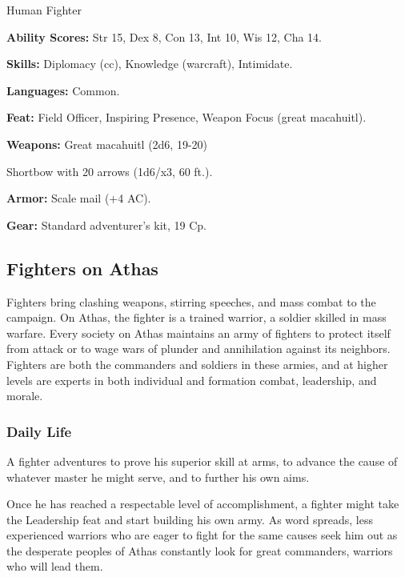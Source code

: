 Human Fighter

\textbf{Ability Scores:} Str 15, Dex 8, Con 13, Int 10, Wis 12, Cha 14.

\textbf{Skills:} Diplomacy (cc), Knowledge (warcraft), Intimidate.

\textbf{Languages:} Common.

\textbf{Feat:} Field Officer, Inspiring Presence, Weapon Focus (great macahuitl).

\textbf{Weapons:} Great macahuitl (2d6, 19-20)

Shortbow with 20 arrows (1d6/x3, 60 ft.).

\textbf{Armor:} Scale mail (+4 AC).

\textbf{Gear:} Standard adventurer’s kit, 19 Cp.

\subsection{Fighters on Athas}

Fighters bring clashing weapons, stirring speeches, and mass combat to the campaign. On Athas, the fighter is a trained warrior, a soldier skilled in mass warfare. Every society on Athas maintains an army of fighters to protect itself from attack or to wage wars of plunder and annihilation against its neighbors. Fighters are both the commanders and soldiers in these armies, and at higher levels are experts in both individual and formation combat, leadership, and morale.

\subsubsection{Daily Life}

A fighter adventures to prove his superior skill at arms, to advance the cause of whatever master he might serve, and to further his own aims.

Once he has reached a respectable level of accomplishment, a fighter might take the Leadership feat and start building his own army. As word spreads, less experienced warriors who are eager to fight for the same causes seek him out as the desperate peoples of Athas constantly look for great commanders, warriors who will lead them.

